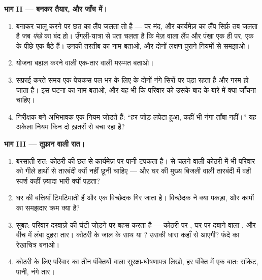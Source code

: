 \begin{problem}
\medskip\noindent\textbf{भाग II --- बनकर तैयार, और जाँच में।}
\begin{enumerate}[resume]
  \item बनाकर चालू करने पर छत का लैंप जलता तो है --- पर मंद, और
        कार्यमेज़ का लैंप सिर्फ़ तब जलता है जब \emph{पंखे} का 
        बंद हो। उँगली-यात्रा से पता चलता है कि मेज़ वाला लैंप और
        पंखा एक ही  पर, एक के पीछे एक बैठे हैं। उनकी तरतीब का
        नाम बताओ, और दोनों लक्षण पुराने नियमों से समझाओ।
  \item योजना बहाल करने वाली एक-तार वाली मरम्मत बताओ।
  \item सफ़ाई करते समय एक पेचकस पल भर के लिए  के दोनों नंगे
        सिरों पर पड़ा रहता है और गरम हो जाता है। इस घटना का नाम
        बताओ, और यह भी कि परिवार को उसके बाद  के बारे में क्या
        जाँचना चाहिए।
  \item निरीक्षक बने अभिभावक एक नियम जोड़ते हैं: ``हर जोड़ लपेटा हुआ,
        कहीं भी नंगा ताँबा नहीं।'' यह अकेला नियम किन दो ख़तरों से
        बचा रहा है?
\end{enumerate}

\medskip\noindent\textbf{भाग III --- तूफ़ान वाली रात।}
\begin{enumerate}[resume]
  \item बरसाती रात: कोठरी की छत से कार्यमेज़ पर पानी टपकता है।
         से चलने वाली कोठरी में भी परिवार को गीले हाथों से
        तारबंदी क्यों नहीं छूनी चाहिए --- और घर की मुख्य बिजली वाली
        तारबंदी में वही स्पर्श कहीं ज़्यादा भारी क्यों पड़ता?
  \item घर की बत्तियाँ टिमटिमाती हैं और एक विच्छेदक गिर जाता है।
        विच्छेदक ने क्या पकड़ा, और कामों का समझदार क्रम क्या है?
  \item सुबह: परिवार दरवाज़े की घंटी जोड़ने पर बहस करता है --- कोठरी
        पर , घर पर दबाने वाला , और बीच में लंबा दुहरा तार।
        कोठरी के जाल के साथ  या ? उसकी धारा कहाँ
        से आएगी? फंदे का रेखाचित्र बनाओ।
  \item कोठरी के लिए परिवार का तीन पंक्तियों वाला सुरक्षा-घोषणापत्र
        लिखो, हर पंक्ति में एक बात: सॉकेट, पानी, नंगे तार।
\end{enumerate}
\end{problem}
